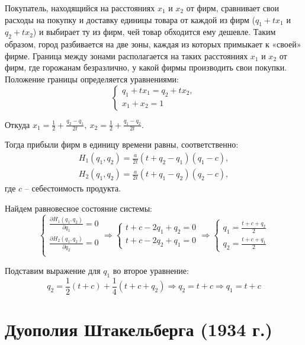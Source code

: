 \documentclass[12pt,a4paper,titlepage,oneside]{book}
\theoremstyle{definition}
\theoremstyle{plain}
\theoremstyle{remark}
\theoremstyle{remark}
\theoremstyle{plain}
\theoremstyle{plain}
\begin{document}
Покупатель, находящийся на расстояниях $x_1$ и $x_2$ от фирм, сравнивает свои расходы на покупку и доставку единицы товара от каждой из фирм ($q_1 + tx_1$ и $q_2 + tx_2$) и выбирает ту из фирм, чей товар обходится ему дешевле. Таким образом, город разбивается на две зоны, каждая из которых примыкает к «своей» фирме. Граница между зонами располагается на таких расстояниях $x_1$ и $x_2$ от фирм, где горожанам безразлично, у какой фирмы производить свои покупки. Положение границы определяется уравнениями:
\begin{equation*}
\begin{cases}
q_1 + tx_1 = q_2 + tx_2,\\
x_1+x_2=1
\end{cases}
\end{equation*}

Откуда $\displaystyle x_1 = \frac1{2}+\frac{q_2-q_1}{2t},~\displaystyle x_2 = \frac1{2}+\frac{q_1-q_2}{2t}$. \vspace{1ex}

Тогда прибыли фирм в единицу времени равны, соответственно:
\begin{align*}
H_1(q_1,q_2) = \frac{a}{2t}(t+q_2 -q_1)(q_1-c), \\
H_2(q_1,q_2) = \frac{a}{2t}(t+q_1 -q_2)(q_2-c),
\end{align*}
где $c$ -- себестоимость продукта.

Найдем равновесное состояние системы:
\begin{equation*}
\begin{cases}
\displaystyle \frac{\partial H_1(q_1,q_2)}{\partial q_1} = 0 \\[3ex]
\displaystyle \frac{\partial H_2(q_1,q_2)}{\partial q_2} = 0 \\
\end{cases} 
\Longrightarrow
\begin{cases}
t + c -2q_1 + q_2 = 0 \\
t + c -2q_2 + q_1 = 0
\end{cases} 
\Longrightarrow
\begin{cases}
\displaystyle q_1=\frac{t+c+q_2}{2}\\[3ex]
\displaystyle q_2=\frac{t+c+q_1}{2}
\end{cases}
\end{equation*}

Подставим выражение для $q_1$ во второе уравнение:
$$q_2 = \frac1{2}(t + c) + \frac1{4}(t+c+q_2) \Rightarrow q_2 = t+c \Rightarrow q_1 = t+c$$

\section{Дуополия Штакельберга (1934 г.)}
\end{document}
